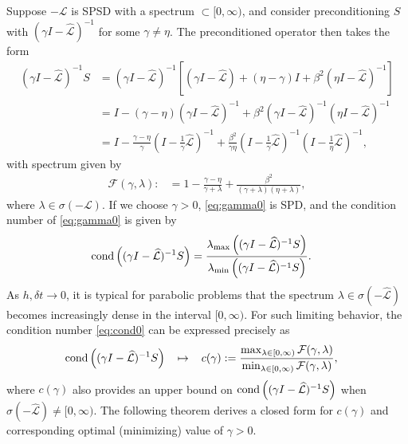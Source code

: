 \documentclass[review]{siamart}
\begin{document}
Suppose $-\mathcal{L}$ is SPSD with a spectrum $\subset [0,\infty)$, and
consider preconditioning $S$ with $(\gamma I- \widehat{\mathcal{L}})^{-1}$ for
some $\gamma \neq \eta$. The preconditioned operator then takes the form
%
\begin{align}\nonumber
(\gamma I- \widehat{\mathcal{L}})^{-1}S & = (\gamma I - \widehat{\mathcal{L}})^{-1}
	\left[ (\gamma I - \widehat{\mathcal{L}}) + (\eta-\gamma)I + \beta^2 (\eta I - \widehat{\mathcal{L}})^{-1}\right] \\
& = I - (\gamma - \eta)( \gamma I- \widehat{\mathcal{L}})^{-1} + 
	\beta^2( \gamma I- \widehat{\mathcal{L}})^{-1}
		( \eta I-\widehat{\mathcal{L}})^{-1} \nonumber\\
& = I - \frac{\gamma - \eta}{\gamma} ( I- \tfrac{1}{\gamma}\widehat{\mathcal{L}})^{-1} + 
	\frac{\beta^2}{\gamma\eta}( I- \tfrac{1}{\gamma}\widehat{\mathcal{L}})^{-1}
		( I- \tfrac{1}{\eta}\widehat{\mathcal{L}})^{-1},\label{eq:gamma0}
\end{align}
%
with spectrum given by
%
\begin{align}\label{eq:eig_gamma}
\mathcal{F}(\gamma,\lambda) :&= 
	1 - \frac{\gamma-\eta}{\gamma + \lambda} + \frac{\beta^2}{(\gamma + \lambda)(\eta+\lambda)},
\end{align}
%
where $\lambda\in\sigma(-\mathcal{L})$. If we choose $\gamma > 0$,
\eqref{eq:gamma0} is SPD, and the condition number of \eqref{eq:gamma0} is given by
%
\begin{align}\label{eq:cond0}
\textnormal{cond}\left((\gamma I- \widehat{\mathcal{L}})^{-1}S\right) & =
	\frac{\lambda_{\max}\left((\gamma I- \widehat{\mathcal{L}})^{-1}S\right)}
		{\lambda_{\min}\left((\gamma I- \widehat{\mathcal{L}})^{-1}S\right)}.
\end{align}
%
As $h,\delta t\to 0$, it is typical for parabolic problems that
the spectrum $\lambda\in\sigma(-\widehat{\mathcal{L}})$
becomes increasingly dense in the interval $[0,\infty)$. For such limiting
behavior, the condition number \eqref{eq:cond0} can be expressed
precisely as
%
\begin{align}\label{eq:cond1}
\textnormal{cond}\left((\gamma I- \widehat{\mathcal{L}})^{-1}S\right) &
	\hspace{2ex}\mapsto\hspace{2ex}
	c(\gamma) :=
	\frac{\max_{\lambda\in[0,\infty)} \mathcal{F}(\gamma,\lambda)}
		{\min_{\lambda\in[0,\infty)} \mathcal{F}(\gamma,\lambda)},
\end{align}
%
where $c(\gamma)$ also provides an upper bound on
$\textnormal{cond}\left((\gamma I- \widehat{\mathcal{L}})^{-1}S\right)$ when
$\sigma(-\widehat{\mathcal{L}})\neq [0,\infty)$. The following theorem 
derives a closed form for $c(\gamma)$ and corresponding optimal
(minimizing) value of $\gamma > 0$.
\end{document}
